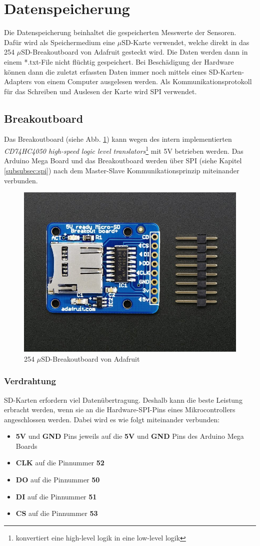 \section{Datenspeicherung}
Die Datenspeicherung beinhaltet die gespeicherten Messwerte der Sensoren. Dafür wird als Speichermedium eine $\mu$SD-Karte verwendet, welche direkt in das 254 $\mu$SD-Breakoutboard von Adafruit gesteckt wird. Die Daten werden dann in einem *.txt-File nicht flüchtig gespeichert. Bei Beschädigung der Hardware können dann die zuletzt erfassten Daten immer noch mittels eines SD-Karten-Adapters von einem Computer ausgelesen werden. Als Kommunikationsprotokoll für das Schreiben und Auslesen der Karte wird SPI verwendet.\\
\subsection{Breakoutboard}
Das Breakoutboard (siehe Abb. \ref{fig:muSDBreakout}) kann wegen des intern implementierten \textit{CD74HC4050 high-speed logic level translators}\footnote{konvertiert eine high-level logik in eine low-level logik} mit 5V betrieben werden. Das Arduino Mega Board und das Breakoutboard werden über SPI (siehe Kapitel \ref{subsubsec:spi}) nach dem Master-Slave Kommunikationsprinzip miteinander verbunden. 
\begin{figure}[h]
\centering
\includegraphics[width=0.5\linewidth]{graphics/Datenspeicherung/micro_sd_card_breakout.png}
\caption{254 $\mu$SD-Breakoutboard von Adafruit \cite{ladyada2018}}
\label{fig:muSDBreakout}
\end{figure}

\subsubsection*{Verdrahtung}
SD-Karten erfordern viel Datenübertragung. Deshalb kann die beste Leistung erbracht werden, wenn sie an die Hardware-SPI-Pins eines Mikrocontrollers angeschlossen werden. Dabei wird es wie folgt miteinander verbunden: \cite{ladyada2018}
\begin{itemize}
\item \textbf{5V} und \textbf{GND} Pins jeweils auf die \textbf{5V} und \textbf{GND} Pins des Arduino Mega Boards
\item \textbf{CLK} auf die Pinnummer \textbf{52}
\item \textbf{DO} auf die Pinnummer \textbf{50}
\item \textbf{DI} auf die Pinnummer \textbf{51}
\item \textbf{CS} auf die Pinnummer \textbf{53}
\end{itemize}
\newpage

